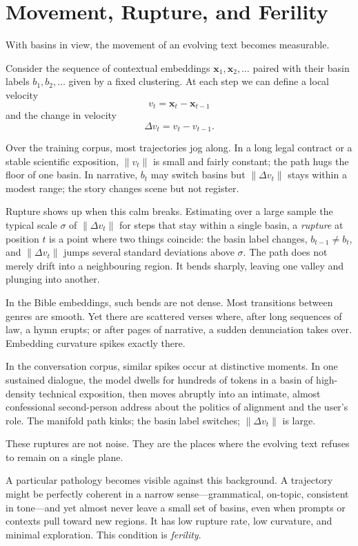 \documentclass[12pt,a4paper]{article}
\begin{document}
\section{Movement, Rupture, and Ferility}

With basins in view, the movement of an evolving text becomes measurable.

Consider the sequence of contextual embeddings $\mathbf{x}_1, \mathbf{x}_2, \dots$ paired with their basin labels $b_1, b_2, \dots$ given by a fixed clustering. At each step we can define a local velocity
\[
v_t = \mathbf{x}_t - \mathbf{x}_{t-1}
\]
and the change in velocity
\[
\Delta v_t = v_t - v_{t-1}.
\]

Over the training corpus, most trajectories jog along. In a long legal contract or a stable scientific exposition, $\|v_t\|$ is small and fairly constant; the path hugs the floor of one basin. In narrative, $b_t$ may switch basins but $\|\Delta v_t\|$ stays within a modest range; the story changes scene but not register.

Rupture shows up when this calm breaks. Estimating over a large sample the typical scale $\sigma$ of $\|\Delta v_t\|$ for steps that stay within a single basin, a \emph{rupture} at position $t$ is a point where two things coincide: the basin label changes, $b_{t-1} \neq b_t$, and $\|\Delta v_t\|$ jumps several standard deviations above $\sigma$. The path does not merely drift into a neighbouring region. It bends sharply, leaving one valley and plunging into another.

In the Bible embeddings, such bends are not dense. Most transitions between genres are smooth. Yet there are scattered verses where, after long sequences of law, a hymn erupts; or after pages of narrative, a sudden denunciation takes over. Embedding curvature spikes exactly there.

In the conversation corpus, similar spikes occur at distinctive moments. In one sustained dialogue, the model dwells for hundreds of tokens in a basin of high-density technical exposition, then moves abruptly into an intimate, almost confessional second-person address about the politics of alignment and the user's role. The manifold path kinks; the basin label switches; $\|\Delta v_t\|$ is large.

These ruptures are not noise. They are the places where the evolving text refuses to remain on a single plane.

A particular pathology becomes visible against this background. A trajectory might be perfectly coherent in a narrow sense---grammatical, on-topic, consistent in tone---and yet almost never leave a small set of basins, even when prompts or contexts pull toward new regions. It has low rupture rate, low curvature, and minimal exploration. This condition is \emph{ferility}.
\end{document}
